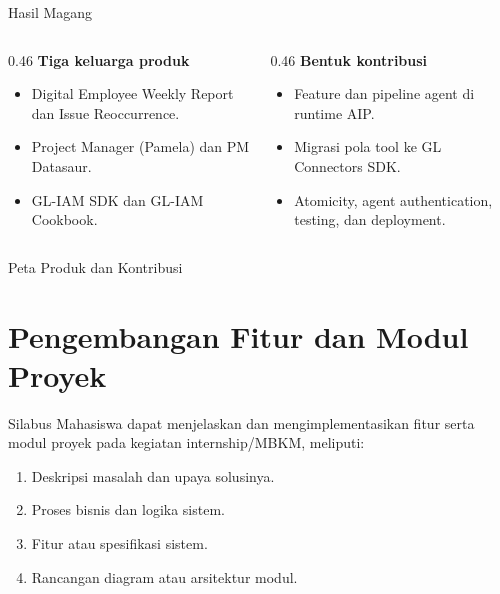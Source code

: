 \begin{contentframe}{Hasil Magang}
    \begin{columns}[T,onlytextwidth]
        \begin{column}{0.46\textwidth}
            \textbf{Tiga keluarga produk}\par
            \begin{itemize}\setlength{\itemsep}{3pt}
                \item Digital Employee Weekly Report dan Issue Reoccurrence.
                \item Project Manager (Pamela) dan PM Datasaur.
                \item GL-IAM SDK dan GL-IAM Cookbook.
            \end{itemize}
        \end{column}
        \begin{column}{0.46\textwidth}
            \textbf{Bentuk kontribusi}\par
            \begin{itemize}\setlength{\itemsep}{3pt}
                \item Feature dan pipeline agent di runtime AIP.
                \item Migrasi pola tool ke GL Connectors SDK.
                \item Atomicity, agent authentication, testing, dan deployment.
            \end{itemize}
        \end{column}
    \end{columns}
\end{contentframe}

\begin{contentframe}{Peta Produk dan Kontribusi}
\end{contentframe}

\section{Pengembangan Fitur dan Modul Proyek}

\begin{contentframe}{Silabus}
    \small
    Mahasiswa dapat menjelaskan dan mengimplementasikan fitur serta modul proyek pada kegiatan internship/MBKM, meliputi:
    \begin{enumerate}\setlength{\itemsep}{4pt}
        \item Deskripsi masalah dan upaya solusinya.
        \item Proses bisnis dan logika sistem.
        \item Fitur atau spesifikasi sistem.
        \item Rancangan diagram atau arsitektur modul.
    \end{enumerate}
\end{contentframe}

